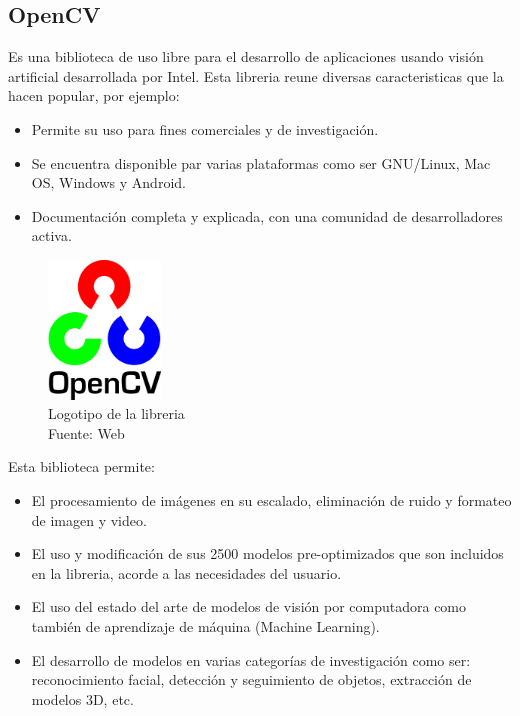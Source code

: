 \subsection{OpenCV}
Es una biblioteca de uso libre para el desarrollo de aplicaciones usando visión artificial desarrollada por Intel. Esta libreria reune diversas caracteristicas que la hacen popular, por ejemplo: 
\begin{itemize}
    \item Permite su uso para fines comerciales y de investigación.
    \item Se encuentra disponible par varias plataformas como ser GNU/Linux, Mac OS, Windows y Android.
    \item Documentación completa y explicada, con una comunidad de desarrolladores activa.
\end{itemize}

\begin{figure}[H]
    \begin{center}
        \includegraphics[width=3cm]{img/capitulo_2/cv2_logo.png}
    \end{center}
    \caption{Logotipo de la libreria\\Fuente: Web}
    \label{fig:cv2_logo}
\end{figure}

Esta biblioteca permite:
\begin{itemize}
    \item El procesamiento de imágenes en su escalado, eliminación de ruido y formateo de imagen y video.
    \item El uso y modificación de sus 2500 modelos pre-optimizados que son incluidos en la libreria, acorde a las necesidades del usuario.
    \item El uso del estado del arte de modelos de visión por computadora como también de aprendizaje de máquina (Machine Learning).
    \item El desarrollo de modelos en varias categorías de investigación como ser: reconocimiento facial, detección y seguimiento de objetos, extracción de modelos 3D, etc.
\end{itemize}

